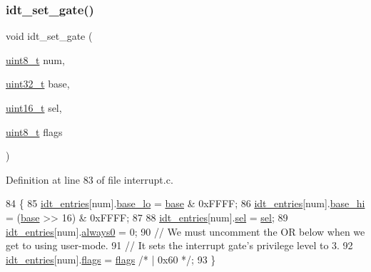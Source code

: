 \subsubsection{\texorpdfstring{idt\+\_\+set\+\_\+gate()}{idt\_set\_gate()}}
{\footnotesize\ttfamily void idt\+\_\+set\+\_\+gate (\begin{DoxyParamCaption}\item[{\hyperlink{a00134_aba7bc1797add20fe3efdf37ced1182c5_aba7bc1797add20fe3efdf37ced1182c5}{uint8\+\_\+t}}]{num,  }\item[{\hyperlink{a00134_a435d1572bf3f880d55459d9805097f62_a435d1572bf3f880d55459d9805097f62}{uint32\+\_\+t}}]{base,  }\item[{\hyperlink{a00134_a273cf69d639a59973b6019625df33e30_a273cf69d639a59973b6019625df33e30}{uint16\+\_\+t}}]{sel,  }\item[{\hyperlink{a00134_aba7bc1797add20fe3efdf37ced1182c5_aba7bc1797add20fe3efdf37ced1182c5}{uint8\+\_\+t}}]{flags }\end{DoxyParamCaption})}



Definition at line 83 of file interrupt.\+c.


\begin{DoxyCode}
84 \{
85     \hyperlink{a00104_a02c62ffc54da283f5faaa40b125d2dce_a02c62ffc54da283f5faaa40b125d2dce}{idt\_entries}[num].\hyperlink{a00230_a4b5fce0881deb4959d33da77d1ed0202_a4b5fce0881deb4959d33da77d1ed0202}{base\_lo} = \hyperlink{a00098_a0523cedff47e2441fc198b7770ec5d3f_a0523cedff47e2441fc198b7770ec5d3f}{base} & 0xFFFF;
86     \hyperlink{a00104_a02c62ffc54da283f5faaa40b125d2dce_a02c62ffc54da283f5faaa40b125d2dce}{idt\_entries}[num].\hyperlink{a00230_af46adb2603d1d8b4a3bedf7f1c6daed4_af46adb2603d1d8b4a3bedf7f1c6daed4}{base\_hi} = (\hyperlink{a00098_a0523cedff47e2441fc198b7770ec5d3f_a0523cedff47e2441fc198b7770ec5d3f}{base} >> 16) & 0xFFFF;
87 
88     \hyperlink{a00104_a02c62ffc54da283f5faaa40b125d2dce_a02c62ffc54da283f5faaa40b125d2dce}{idt\_entries}[num].\hyperlink{a00230_a3c9321c263139e56901a05efee220047_a3c9321c263139e56901a05efee220047}{sel}     = \hyperlink{a00104_af0b0a7e10694e3b600c7561311cc8271_af0b0a7e10694e3b600c7561311cc8271}{sel};
89     \hyperlink{a00104_a02c62ffc54da283f5faaa40b125d2dce_a02c62ffc54da283f5faaa40b125d2dce}{idt\_entries}[num].\hyperlink{a00230_adc747b3ff87142c71b7b8c51e03c067c_adc747b3ff87142c71b7b8c51e03c067c}{always0} = 0;
90     \textcolor{comment}{// We must uncomment the OR below when we get to using user-mode.}
91     \textcolor{comment}{// It sets the interrupt gate's privilege level to 3.}
92     \hyperlink{a00104_a02c62ffc54da283f5faaa40b125d2dce_a02c62ffc54da283f5faaa40b125d2dce}{idt\_entries}[num].\hyperlink{a00230_a02277c77564820972ae5df0a37c80be0_a02277c77564820972ae5df0a37c80be0}{flags}   = \hyperlink{a00104_aa2585d779da0ab21273a8d92de9a0ebe_aa2585d779da0ab21273a8d92de9a0ebe}{flags} \textcolor{comment}{/* | 0x60 */};
93 \}
\end{DoxyCode}
\mbox{\label{a00101_a35fe413107af682030ab7a4b6dff19b8_a35fe413107af682030ab7a4b6dff19b8}} 
